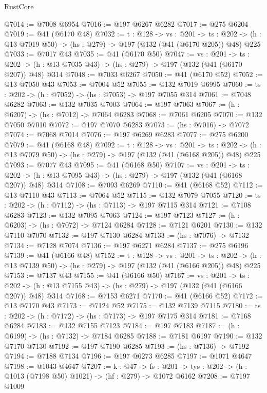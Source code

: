 \begin{lexlean}{RustCore}
\begin{coremodule}
@7014 := @7008 @6954
@7016 := @197 @6267 @6282
@7017 := @275 @6204
@7019 := @41 (@6170 @48)
@7032 := {t : @128} ->
  {vs : @201} ->
  {ts : @202} -> (h : @13 @7019 @50) -> (hs : @279) -> @197 (@132 (@41 (@6170 @205)) @48) @225
@7033 := @7017 @43
@7035 := @41 (@6170 @50)
@7047 := {vs : @201} ->
  {ts : @202} -> (h : @13 @7035 @43) -> (hs : @279) -> @197 (@132 (@41 (@6170 @207)) @48) @314
@7048 := @7033 @6267
@7050 := @41 (@6170 @52)
@7052 := @13 @7050 @43
@7053 := @7004 @52
@7055 := @132 @7019 @6995
@7060 := {ts : @202} -> (h : @7052) -> (hs : @7053) -> @197 @7055 @314
@7061 := @7048 @6282
@7063 := @132 @7035 @7003
@7064 := @197 @7063
@7067 := (h : @6207) -> (hs : @7012) -> @7064 @6283
@7068 := @7061 @6205
@7070 := @132 @7050 @7010
@7072 := @197 @7070 @6283
@7073 := (hs : @7016) -> @7072
@7074 := @7068 @7014
@7076 := @197 @6269 @6283
@7077 := @275 @6200
@7079 := @41 (@6168 @48)
@7092 := {t : @128} ->
  {vs : @201} ->
  {ts : @202} -> (h : @13 @7079 @50) -> (hs : @279) -> @197 (@132 (@41 (@6168 @205)) @48) @225
@7093 := @7077 @43
@7095 := @41 (@6168 @50)
@7107 := {vs : @201} ->
  {ts : @202} -> (h : @13 @7095 @43) -> (hs : @279) -> @197 (@132 (@41 (@6168 @207)) @48) @314
@7108 := @7093 @6269
@7110 := @41 (@6168 @52)
@7112 := @13 @7110 @43
@7113 := @7064 @52
@7115 := @132 @7079 @7055
@7120 := {ts : @202} -> (h : @7112) -> (hs : @7113) -> @197 @7115 @314
@7121 := @7108 @6283
@7123 := @132 @7095 @7063
@7124 := @197 @7123
@7127 := (h : @6203) -> (hs : @7072) -> @7124 @6284
@7128 := @7121 @6201
@7130 := @132 @7110 @7070
@7132 := @197 @7130 @6284
@7133 := (hs : @7076) -> @7132
@7134 := @7128 @7074
@7136 := @197 @6271 @6284
@7137 := @275 @6196
@7139 := @41 (@6166 @48)
@7152 := {t : @128} ->
  {vs : @201} ->
  {ts : @202} -> (h : @13 @7139 @50) -> (hs : @279) -> @197 (@132 (@41 (@6166 @205)) @48) @225
@7153 := @7137 @43
@7155 := @41 (@6166 @50)
@7167 := {vs : @201} ->
  {ts : @202} -> (h : @13 @7155 @43) -> (hs : @279) -> @197 (@132 (@41 (@6166 @207)) @48) @314
@7168 := @7153 @6271
@7170 := @41 (@6166 @52)
@7172 := @13 @7170 @43
@7173 := @7124 @52
@7175 := @132 @7139 @7115
@7180 := {ts : @202} -> (h : @7172) -> (hs : @7173) -> @197 @7175 @314
@7181 := @7168 @6284
@7183 := @132 @7155 @7123
@7184 := @197 @7183
@7187 := (h : @6199) -> (hs : @7132) -> @7184 @6285
@7188 := @7181 @6197
@7190 := @132 @7170 @7130
@7192 := @197 @7190 @6285
@7193 := (hs : @7136) -> @7192
@7194 := @7188 @7134
@7196 := @197 @6273 @6285
@7197 := @1071 @4647
@7198 := @1043 @4647
@7207 := {k : @47} ->
  {fs : @201} -> {tys : @202} -> (h : @1013 (@7198 @50) @1021) -> (hf : @279) -> @1072 @6162
@7208 := @7197 @1009

\end{coremodule}
\end{lexlean}
